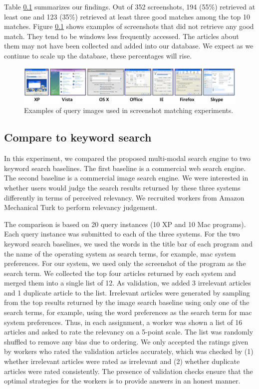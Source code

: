 \documentclass{www2010-submission}
\begin{document}
Table \ref{} summarizes our findings. Out of 352 screenshots, 194
(55\%) retrieved at least one and 123 (35\%) retrieved at least three
good matches among the top 10 matches. Figure \ref{} shows examples of
screenshots that did not retrieve any good match. They tend to be
windows less frequently accessed. The articles about them may not have
been collected and added into our database.  We expect as we continue
to scale up the database, these percentages will rise.

\begin{figure}
\includegraphics[width=2\columnwidth]{figure/query_examples.png}
\caption{Examples of query images used in screenshot matching
experiments.}
\label{fig:query_examples}
\end{figure}


\subsection{Compare to keyword search}

In this experiment, we compared the proposed multi-modal search engine
to two keyword search baselines. The first baseline is a commercial
web search engine.  The second baseline is a commercial image search
engine. We were interested in whether users would judge the search
results returned by these three systems differently in terms of
perceived relevancy. We recruited workers from Amazon Mechanical Turk
to perform relevancy judgement.

The comparison is based on 20 query instances (10 XP and 10 Mac
programs). Each query instance was submitted to each of the three
systems. For the two keyword search baselines, we used the words in
the title bar of each program and the name of the operating system as
search terms, for example, mac system preferences. For our system, we
used only the screenshot of the program as the search term. We
collected the top four articles returned by each system and merged
them into a single list of 12. As validation, we added 3 irrelevant
articles and 1 duplicate article to the list. Irrelevant articles were
generated by sampling from the top results returned by the image
search baseline using only one of the search terms, for example, using
the word preferences as the search term for mac system
preferences. Thus, in each assignment, a worker was shown a list of 16
articles and asked to rate the relevancy on a 5-point scale. The list
was randomly shuffled to remove any bias due to ordering.  We only
accepted the ratings given by workers who rated the validation
articles accurately, which was checked by (1) whether irrelevant
articles were rated as irrelevant and (2) whether duplicate articles
were rated consistently. The presence of validation checks
ensure that the optimal strategies for the workers is to
provide answers in an honest manner.
\end{document}
